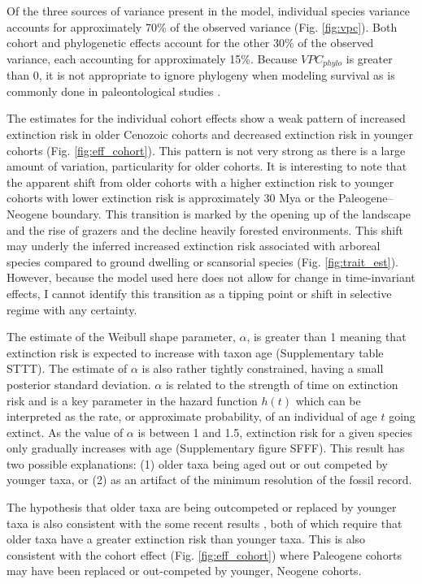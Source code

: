 \documentclass[12pt]{article}
\begin{document}
Of the three sources of variance present in the model, individual species variance accounts for approximately 70\% of the observed variance (Fig. \ref{fig:vpc}). Both cohort and phylogenetic effects account for the other 30\% of the observed variance, each accounting for approximately 15\%. Because $VPC_{phylo}$ is greater than 0, it is not appropriate to ignore phylogeny when modeling survival \cite{Housworth2004} as is commonly done in paleontological studies \cite{Alroy2009,Foote2013,Jablonski2006a,Hunt2007a,Liow2008,Payne2007}. 

The estimates for the individual cohort effects show a weak pattern of increased extinction risk in older Cenozoic cohorts and decreased extinction risk in younger cohorts (Fig. \ref{fig:eff_cohort}). This pattern is not very strong as there is a large amount of variation, particularity for older cohorts. It is interesting to note that the apparent shift from older cohorts with a higher extinction risk to younger cohorts with lower extinction risk is approximately 30 Mya or the Paleogene--Neogene boundary. This transition is marked by the opening up of the landscape and the rise of grazers and the decline heavily forested environments. This shift may underly the inferred increased extinction risk associated with arboreal species compared to ground dwelling or scansorial species (Fig. \ref{fig:trait_est}). However, because the model used here does not allow for change in time-invariant effects, I cannot identify this transition as a tipping point or shift in selective regime with any certainty.

The estimate of the Weibull shape parameter, $\alpha$, is greater than 1 meaning that extinction risk is expected to increase with taxon age (Supplementary table STTT). The estimate of $\alpha$ is also rather tightly constrained, having a small posterior standard deviation. $\alpha$ is related to the strength of time on extinction risk and is a key parameter in the hazard function $h(t)$ which can be interpreted as the rate, or approximate probability, of an individual of age $t$ going extinct. As the value of $\alpha$ is between 1 and 1.5, extinction risk for a given species only gradually increases with age (Supplementary figure SFFF). This result has two possible explanations: (1) older taxa being aged out or out competed by younger taxa, or (2) as an artifact of the minimum resolution of the fossil record.

The hypothesis that older taxa are being outcompeted or replaced by younger taxa is also consistent with the some recent results \cite{Wagner2014b,Quental2013}, both of which require that older taxa have a greater extinction risk than younger taxa. This is also consistent with the cohort effect (Fig. \ref{fig:eff_cohort}) where Paleogene cohorts may have been replaced or out-competed by younger, Neogene cohorts.
\end{document}
